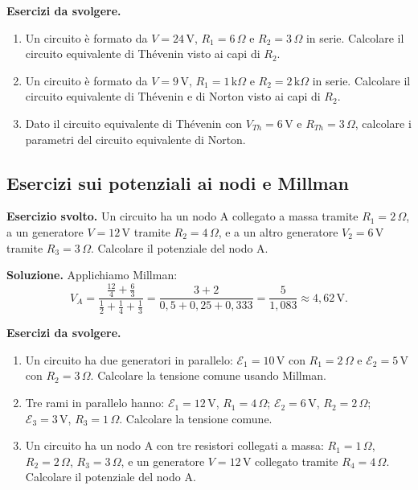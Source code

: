 \textbf{Esercizi da svolgere.}
\begin{enumerate}[leftmargin=1cm]
  \item Un circuito è formato da \(V = 24\,\text{V}\), \(R_1 = 6\,\Omega\) e \(R_2 = 3\,\Omega\) in serie. Calcolare il circuito equivalente di Thévenin visto ai capi di \(R_2\).
  \item Un circuito è formato da \(V = 9\,\text{V}\), \(R_1 = 1\,\text{k}\Omega\) e \(R_2 = 2\,\text{k}\Omega\) in serie. Calcolare il circuito equivalente di Thévenin e di Norton visto ai capi di \(R_2\).
  \item Dato il circuito equivalente di Thévenin con \(V_{Th} = 6\,\text{V}\) e \(R_{Th} = 3\,\Omega\), calcolare i parametri del circuito equivalente di Norton.
\end{enumerate}

\subsection{Esercizi sui potenziali ai nodi e Millman}

\begin{esercizio}
\textbf{Esercizio svolto.} Un circuito ha un nodo A collegato a massa tramite \(R_1 = 2\,\Omega\), a un generatore \(V = 12\,\text{V}\) tramite \(R_2 = 4\,\Omega\), e a un altro generatore \(V_2 = 6\,\text{V}\) tramite \(R_3 = 3\,\Omega\). Calcolare il potenziale del nodo A.

\smallskip
\textbf{Soluzione.} Applichiamo Millman:
\[
V_A = \frac{\frac{12}{4} + \frac{6}{3}}{\frac{1}{2} + \frac{1}{4} + \frac{1}{3}} = \frac{3 + 2}{0{,}5 + 0{,}25 + 0{,}333} = \frac{5}{1{,}083} \approx 4{,}62\,\text{V}.
\]
\end{esercizio}

\textbf{Esercizi da svolgere.}
\begin{enumerate}[leftmargin=1cm]
  \item Un circuito ha due generatori in parallelo: \(\mathcal{E}_1 = 10\,\text{V}\) con \(R_1 = 2\,\Omega\) e \(\mathcal{E}_2 = 5\,\text{V}\) con \(R_2 = 3\,\Omega\). Calcolare la tensione comune usando Millman.
  \item Tre rami in parallelo hanno: \(\mathcal{E}_1 = 12\,\text{V}\), \(R_1 = 4\,\Omega\); \(\mathcal{E}_2 = 6\,\text{V}\), \(R_2 = 2\,\Omega\); \(\mathcal{E}_3 = 3\,\text{V}\), \(R_3 = 1\,\Omega\). Calcolare la tensione comune.
  \item Un circuito ha un nodo A con tre resistori collegati a massa: \(R_1 = 1\,\Omega\), \(R_2 = 2\,\Omega\), \(R_3 = 3\,\Omega\), e un generatore \(V = 12\,\text{V}\) collegato tramite \(R_4 = 4\,\Omega\). Calcolare il potenziale del nodo A.
\end{enumerate}